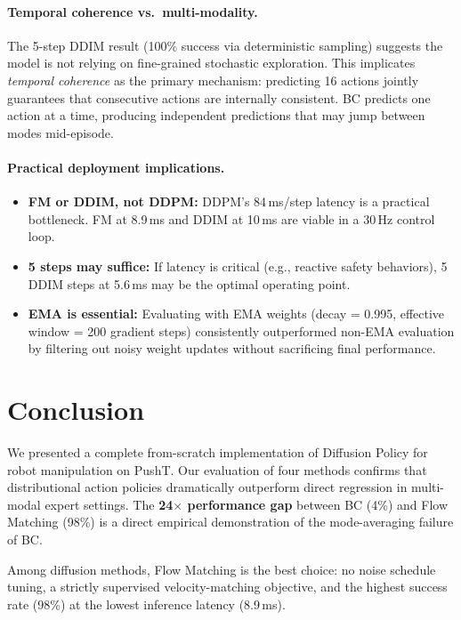 \documentclass[10pt,letterpaper]{article}
\begin{document}
\paragraph{Temporal coherence vs.\ multi-modality.}
The 5-step DDIM result (100\% success via deterministic sampling) suggests the
model is not relying on fine-grained stochastic exploration.
This implicates \emph{temporal coherence} as the primary mechanism: predicting 16
actions jointly guarantees that consecutive actions are internally consistent.
BC predicts one action at a time, producing independent predictions that may jump
between modes mid-episode.

\paragraph{Practical deployment implications.}
\begin{itemize}
  \item \textbf{FM or DDIM, not DDPM:} DDPM's 84\,ms/step latency is a practical
    bottleneck. FM at 8.9\,ms and DDIM at 10\,ms are viable in a 30\,Hz control loop.
  \item \textbf{5 steps may suffice:} If latency is critical (e.g., reactive safety
    behaviors), 5 DDIM steps at 5.6\,ms may be the optimal operating point.
  \item \textbf{EMA is essential:} Evaluating with EMA weights (decay = 0.995,
    effective window = 200 gradient steps) consistently outperformed non-EMA
    evaluation by filtering out noisy weight updates without sacrificing
    final performance.
\end{itemize}

\section{Conclusion}

We presented a complete from-scratch implementation of Diffusion Policy for robot
manipulation on PushT.
Our evaluation of four methods confirms that distributional action policies
dramatically outperform direct regression in multi-modal expert settings.
The \textbf{24$\times$ performance gap} between BC (4\%) and Flow Matching (98\%)
is a direct empirical demonstration of the mode-averaging failure of BC.

Among diffusion methods, Flow Matching is the best choice: no noise schedule
tuning, a strictly supervised velocity-matching objective, and the highest success
rate (98\%) at the lowest inference latency (8.9\,ms).
\end{document}
